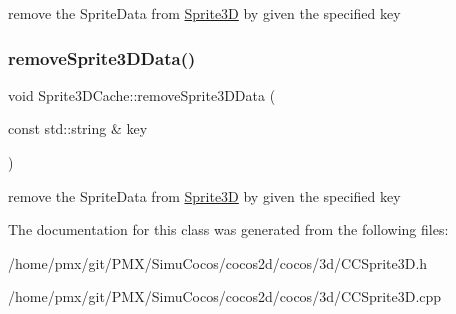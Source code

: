 remove the Sprite\+Data from \hyperlink{classSprite3D}{Sprite3D} by given the specified key \mbox{\label{classSprite3DCache_afac35769b8587bc50efe723463e7082c}} 
\subsubsection{\texorpdfstring{remove\+Sprite3\+D\+Data()}{removeSprite3DData()}\hspace{0.1cm}{\footnotesize\ttfamily [2/2]}}
{\footnotesize\ttfamily void Sprite3\+D\+Cache\+::remove\+Sprite3\+D\+Data (\begin{DoxyParamCaption}\item[{const std\+::string \&}]{key }\end{DoxyParamCaption})}

remove the Sprite\+Data from \hyperlink{classSprite3D}{Sprite3D} by given the specified key 

The documentation for this class was generated from the following files\+:\begin{DoxyCompactItemize}
\item 
/home/pmx/git/\+P\+M\+X/\+Simu\+Cocos/cocos2d/cocos/3d/C\+C\+Sprite3\+D.\+h\item 
/home/pmx/git/\+P\+M\+X/\+Simu\+Cocos/cocos2d/cocos/3d/C\+C\+Sprite3\+D.\+cpp\end{DoxyCompactItemize}
